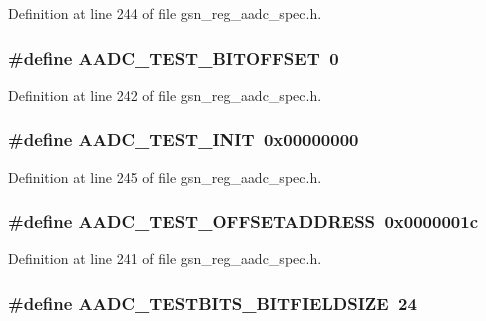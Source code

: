 Definition at line 244 of file gsn\_\-reg\_\-aadc\_\-spec.h.

\hypertarget{a00543_acdd7abeac7fc55820674820bfadaace4}{
\subsubsection[{AADC\_\-TEST\_\-BITOFFSET}]{\setlength{\rightskip}{0pt plus 5cm}\#define AADC\_\-TEST\_\-BITOFFSET~0}}
\label{a00543_acdd7abeac7fc55820674820bfadaace4}


Definition at line 242 of file gsn\_\-reg\_\-aadc\_\-spec.h.

\hypertarget{a00543_af7d03003881636ffa6c9e88731f0b4bb}{
\subsubsection[{AADC\_\-TEST\_\-INIT}]{\setlength{\rightskip}{0pt plus 5cm}\#define AADC\_\-TEST\_\-INIT~0x00000000}}
\label{a00543_af7d03003881636ffa6c9e88731f0b4bb}


Definition at line 245 of file gsn\_\-reg\_\-aadc\_\-spec.h.

\hypertarget{a00543_ab01af92d5b0aa9a67c24d9fcaa313a17}{
\subsubsection[{AADC\_\-TEST\_\-OFFSETADDRESS}]{\setlength{\rightskip}{0pt plus 5cm}\#define AADC\_\-TEST\_\-OFFSETADDRESS~0x0000001c}}
\label{a00543_ab01af92d5b0aa9a67c24d9fcaa313a17}


Definition at line 241 of file gsn\_\-reg\_\-aadc\_\-spec.h.

\hypertarget{a00543_a4fefec84f798f38b6bc74d100460a0f5}{
\subsubsection[{AADC\_\-TESTBITS\_\-BITFIELDSIZE}]{\setlength{\rightskip}{0pt plus 5cm}\#define AADC\_\-TESTBITS\_\-BITFIELDSIZE~24}}
\label{a00543_a4fefec84f798f38b6bc74d100460a0f5}


